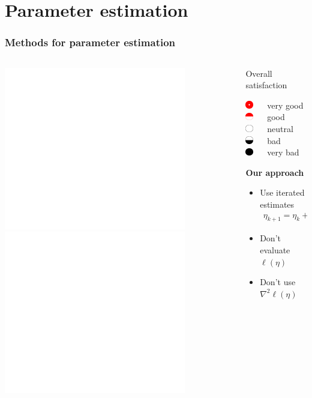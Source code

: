 \documentclass[ 10pt]{beamer}
\begin{document}
\section{Parameter estimation}
\frame
{
\frametitle{Methods for parameter estimation}
\begin{columns}[]
\begin{column}[T]{0.6\textwidth}
\includegraphics<1>[height=2.8in]{mck-final.pdf}
\includegraphics<2->[height=2.8in]{mck-final-overlay.pdf}
\end{column}
\begin{column}[t]{0.4\textwidth}
{\small
Overall satisfaction

\vspace{1mm}
\includegraphics[height=0.13in]{CR5.pdf} $\quad$ very good\\
\vspace{1mm}
\includegraphics[height=0.13in]{CR4.pdf} $\quad$ good\\
\vspace{1mm}
\includegraphics[height=0.13in]{CR3.pdf} $\quad$ neutral\\
\vspace{1mm}
\includegraphics[height=0.13in]{CR2.pdf} $\quad$ bad\\
\vspace{1mm}
\includegraphics[height=0.13in]{CR1.pdf} $\quad$ very bad\\
\vspace{1mm}
}
\pause

{\small
\begin{block}{
\textbf{Our approach}}
\begin{itemize}
\item Use iterated estimates
\begin{align*}
	\eta_{k+1} = \eta_k + \alpha_k p_k
\end{align*}
\item Don't evaluate $\ell( \eta)$
\vspace{1mm}

\item Don't use $\nabla^2 \ell( \eta)$
\end{itemize}
\end{block}
}
\end{column}
\end{columns}

}
\end{document}
